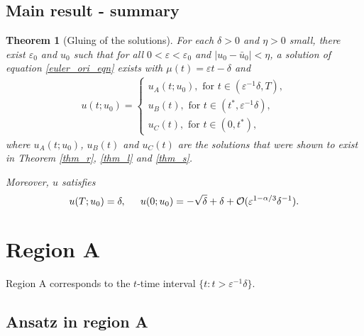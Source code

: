 \documentclass[letterpaper,11pt]{article}
\newcommand{\rmO}{\mathcal{O}}
\newcommand{\eps}{\varepsilon}
\numberwithin{equation}{section}
\theoremstyle{plain}
\newtheorem{theorem}{Theorem}[section]
\begin{document}
\subsection{Main result - summary} \label{main_sum}

\begin{theorem}[Gluing of the solutions]
For each $\delta>0$ and $\eta>0$ small, there exist $\eps_0$ and $u_0$ such that for all $0<\eps<\eps_0$ and $|u_0 - \bar{u}_0|<\eta$, a solution of equation \ref{euler_ori_eqn} exists with $\mu(t) = \eps t - \delta$ and 
\begin{align*}
u(t; u_0)  =\begin{cases}
u_A(t;u_0) , \text{ for }t \in (\eps^{-1}\delta, T),\\
u_B(t), \text{ for } t \in (t^*,\eps^{-1}\delta), \\
u_C(t), \text{ for } t \in (0, t^*),
\end{cases}
\end{align*}
where $u_A(t; u_0)$, $u_B(t)$ and $u_C(t)$ are the solutions that were shown to exist in Theorem \ref{thm_r}, \ref{thm_l} and \ref{thm_s}.

Moreover, $u$ satisfies 
\[
u(T;u_0) = \delta, \hspace{0.2in} u(0;u_0)  = -\sqrt{\delta} +\delta + \rmO( \eps^{1-\alpha/3}\delta^{-1}).
\]
\end{theorem}

\pagebreak



\section{Region A}\label{sec_A}

Region A corresponds to the $t$-time interval $\{ t : t > \eps^{-1}\delta\}$.

\subsection{Ansatz in region A}
\end{document}
